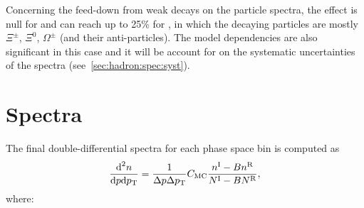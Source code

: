Concerning the feed-down from weak decays on the \vzero particle
spectra, the effect is null for \kzeros and can reach up to 25\%
for \lambs, in which the decaying particles are mostly $\Xi^{\pm}$, $\Xi^0$,
$\Omega^\pm$ (and their anti-particles). The model dependencies are also
significant in this case and it will be account for
on the systematic uncertainties of the spectra (see~\cref{sec:hadron:spec:syst}).


\section{\boldmath Spectra}
\label{sec:hadron:spec}

The final double-differential spectra for each
phase space bin is computed as
\begin{equation}
  \frac{\text{d}^2n}{\text{d}p\text{d}p_\text{T}} = \frac{1}{\Delta p\Delta p_\text{T}} \mbox{$C_\text{MC}$}
  \frac{n^\text{I}-Bn^\text{R}}{N^\text{I}-BN^\text{R}},
  \label{eq:hadron:spec}
\end{equation}
where:
